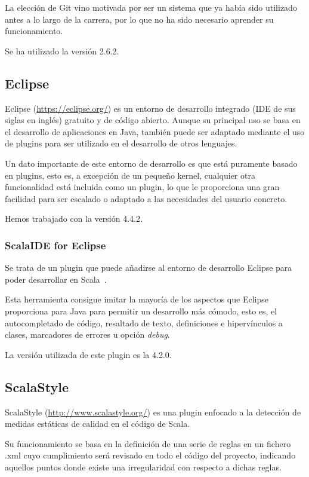La elección de Git vino motivada por ser un sistema que ya había sido utilizado antes a lo largo de la carrera, por lo que no ha sido necesario aprender su funcionamiento.

Se ha utilizado la versión 2.6.2.

\subsection{Eclipse}
Eclipse (\url{https://eclipse.org/}) es un entorno de desarrollo integrado (IDE de sus siglas en inglés) gratuito y de código abierto. Aunque su principal uso se basa en el desarrollo de aplicaciones en Java, también puede ser adaptado mediante el uso de plugins para ser utilizado en el desarrollo de otros lenguajes.

Un dato importante de este entorno de desarrollo es que está puramente basado en plugins, esto es, a excepción de un pequeño kernel, cualquier otra funcionalidad está incluida como un plugin, lo que le proporciona una gran facilidad para ser escalado o adaptado a las necesidades del usuario concreto.

Hemos trabajado con la versión 4.4.2.

\subsubsection{ScalaIDE for Eclipse}

Se trata de un plugin que puede añadirse al entorno de desarrollo Eclipse para poder desarrollar en Scala~\cite{ScalaIDEPage}.

Esta herramienta consigue imitar la mayoría de los aspectos que Eclipse proporciona para Java para permitir un desarrollo más cómodo, esto es, el autocompletado de código, resaltado de texto, definiciones e hipervínculos a clases, marcadores de errores u opción \textit{debug}.

La versión utilizada de este plugin es la 4.2.0.

\subsection{ScalaStyle}

ScalaStyle (\url{http://www.scalastyle.org/}) es una plugin enfocado a la detección de medidas estáticas de calidad en el código de Scala.

Su funcionamiento se basa en la definición de una serie de reglas en un fichero .xml cuyo cumplimiento será revisado en todo el código del proyecto, indicando aquellos puntos donde existe una irregularidad con respecto a dichas reglas.

